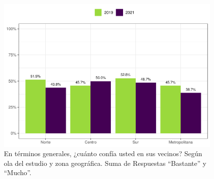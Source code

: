 \documentclass[
  12pt,
]{book}
\begin{document}
\begin{figure}

{\centering \includegraphics{reporte-elsoc_files/figure-latex/vecinos-zona-1} 

}

\caption{En términos generales, ¿cuánto confía usted en sus vecinos? Según ola del estudio y zona geográfica. Suma de Respuestas “Bastante” y “Mucho”.}\label{fig:vecinos-zona}
\end{figure}
\end{document}
